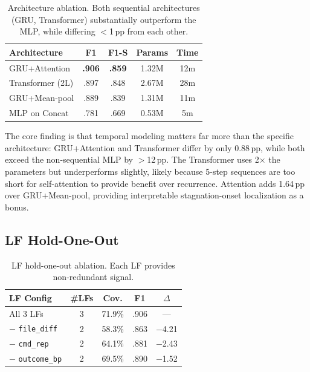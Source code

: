 \documentclass[11pt,a4paper]{article}
\begin{document}
\begin{table}[t]
\centering
\small
\begin{tabular}{lcccc}
\toprule
\textbf{Architecture} & \textbf{F1} & \textbf{F1-S} & \textbf{Params} & \textbf{Time} \\
\midrule
GRU+Attention & \textbf{.906} & \textbf{.859} & 1.32M & 12m \\
Transformer (2L) & .897 & .848 & 2.67M & 28m \\
GRU+Mean-pool & .889 & .839 & 1.31M & 11m \\
MLP on Concat & .781 & .669 & 0.53M & 5m \\
\bottomrule
\end{tabular}
\caption{Architecture ablation. Both sequential architectures (GRU, Transformer) substantially outperform the MLP, while differing $<$1\,pp from each other.}
\label{tab:arch}
\end{table}

The core finding is that temporal modeling matters far more than the specific architecture: GRU+Attention and Transformer differ by only 0.88\,pp, while both exceed the non-sequential MLP by $>$12\,pp.
The Transformer uses 2$\times$ the parameters but underperforms slightly, likely because 5-step sequences are too short for self-attention to provide benefit over recurrence.
Attention adds 1.64\,pp over GRU+Mean-pool, providing interpretable stagnation-onset localization as a bonus.

\subsection{LF Hold-One-Out}
\label{sec:lf-ablation}

\begin{table}[t]
\centering
\small
\begin{tabular}{lcccc}
\toprule
\textbf{LF Config} & \textbf{\#LFs} & \textbf{Cov.} & \textbf{F1} & \textbf{$\Delta$} \\
\midrule
All 3 LFs & 3 & 71.9\% & .906 & --- \\
$-$ \texttt{file\_diff} & 2 & 58.3\% & .863 & $-$4.21 \\
$-$ \texttt{cmd\_rep} & 2 & 64.1\% & .881 & $-$2.43 \\
$-$ \texttt{outcome\_bp} & 2 & 69.5\% & .890 & $-$1.52 \\
\bottomrule
\end{tabular}
\caption{LF hold-one-out ablation. Each LF provides non-redundant signal.}
\label{tab:lf-ablation}
\end{table}
\end{document}
